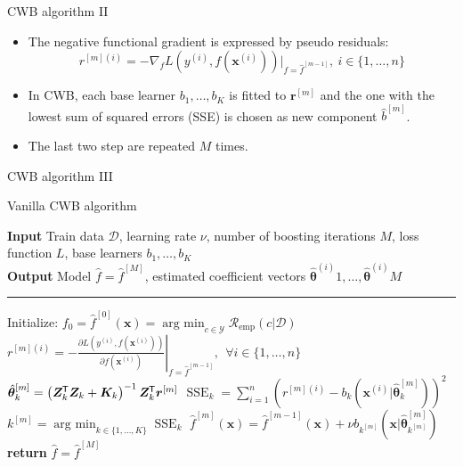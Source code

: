 \documentclass[ignorenonframetext,]{beamer}
\providecommand{\tightlist}{%
  \setlength{\itemsep}{0pt}\setlength{\parskip}{0pt}}
\newcommand*{\tran}{{\mkern-1.5mu\mathsf{T}}}
\newcommand{\D}{\mathcal{D}}
\newcommand{\fh}{\hat{f}}
\newcommand{\fmh}{\fh^{[m]}}
\newcommand{\fmdh}{\fh^{[m-1]}}
\newcommand{\blk}{k}
\newcommand{\blK}{K}
\newcommand{\tbh}{\hat{\bm{\theta}}}
\newcommand{\tbmh}{\hat{\bm{\theta}}^{[m]}}
\newcommand{\tbih}[1][i]{\tbh^{(#1)}}
\newcommand{\xv}{\bm{x}}
\newcommand{\pr}{r}
\newcommand{\prv}{\bm{r}}
\newcommand{\rmi}{\pr^{[m](i)}}
\newcommand{\pd}[2]{\frac{\partial #1}{\partial #2}}
\renewcommand{\xi}[1][i]{\xv^{(#1)}}
\newcommand{\yi}[1][i]{y^{(#1)}}
\newcommand{\Lxyi}{L(\yi, f(\xi))}
\newcommand{\design}{\bm{Z}}
\newcommand{\sse}{\operatorname{SSE}}
\newcommand{\argmin}{\operatorname{arg~min}}
\newcommand{\riske}{\mathcal{R}_{\text{emp}}}
\newcommand{\rmm}{\prv^{[m]}}
\begin{document}
\begin{frame}{CWB algorithm II}
\protect\hypertarget{cwb-algorithm-ii}{}
\begin{itemize}
\tightlist
\item
  The negative functional gradient is expressed by pseudo residuals:
  \[\rmi = -\nabla_f L(y^{(i)}, f(\xi))|_{f = \fmdh},\ i \in \{1, \dots, n\}\]
\item
  In CWB, each base learner \(b_1, \dots, b_K\) is fitted to \(\rmm\)
  and the one with the lowest sum of squared errors (SSE) is chosen as
  new component \(\hat{b}^{[m]}\).
\item
  The last two step are repeated \(M\) times.
\end{itemize}
\end{frame}

\begin{frame}{CWB algorithm III}
\protect\hypertarget{cwb-algorithm-iii}{}
\begin{algorithm}[H]

\footnotesize

\caption{Vanilla CWB algorithm}\label{algo:cwb}
\vspace{0.15cm}
\hspace*{\algorithmicindent} \textbf{Input} Train data $\D$, learning rate $\nu$, number of boosting iterations $M$, loss\\
\hspace*{\algorithmicindent}  function $L$, base learners $b_1, \dots, b_\blK$\\
\hspace*{\algorithmicindent} \textbf{Output} Model $\fh = \hat{f}^{[M]}$, estimated coefficient vectors $\tbih{1}, \ldots, \tbih{M}$\vspace{0.15cm}
\hrule

\begin{algorithmic}[1]
\Procedure{$\operatorname{CWB}$}{$\D,\nu,L,b_1, \dots, b_\blK$}
    \State Initialize: $f_0 = \fh^{[0]}(\xv) = \argmin_{c\in\mathcal{Y}}\riske(c|\D)$
        \State $\rmi = -\left.\pd{\Lxyi}{f(\xi)}\right|_{f = \fmdh},\ \ \forall i \in \{1, \dots, n\}$%
        \For{$\blk \in \{1, \dots, \blK\}$}
            \State $\tbmh_\blk = \left(\design_\blk^\tran \design_\blk + \bm{K}_\blk\right)^{-1} \design^\tran_\blk \rmm$%
            \State $\sse_\blk = \sum_{i=1}^n(\rmi - b_\blk(\xi | \tbmh_\blk))^2$%
        \EndFor
        \State $\blk^{[m]} = \argmin_{\blk\in\{1, \dots, \blK\}} \sse_\blk$%
        \State $\fmh(\xv) = \fmdh(\xv) + \nu b_{\blk^{[m]}} (\xv | \tbmh_{\blk^{[m]}})$
    \EndWhile
    \State \textbf{return} $\fh = \fh^{[M]}$
\EndProcedure
\end{algorithmic}
\end{algorithm}
\end{frame}
\end{document}
